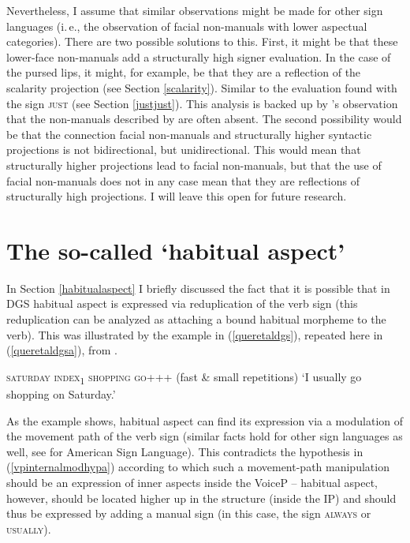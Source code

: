 Nevertheless, I assume that similar observations might be made for other sign languages (i.\,e., the observation of facial non-manuals with lower aspectual categories). There are two possible solutions to this. First, it might be that these lower-face non-manuals add a structurally high signer evaluation. In the case of the pursed lips, it might, for example, be that they are a reflection of the scalarity projection (see Section \ref{scalarity}). Similar to the evaluation found with the sign \textsc{just} (see Section \ref{justjust}). This analysis is backed up by \citeauthor{boven2018throughaspect}'s observation that the non-manuals described by \citet{hoitingslobin2001typological} are often absent. The second possibility would be that the connection facial non-manuals and structurally higher syntactic projections is not bidirectional, but unidirectional. This would mean that structurally higher projections lead to facial non-manuals, but that the use of facial non-manuals does not in any case mean that they are reflections of structurally high projections. I will leave this open for future research.


\section{The so-called `habitual aspect'}\label{habitualtwo}
In Section \ref{habitualaspect} I briefly discussed the fact that it is possible that in DGS habitual aspect is expressed via reduplication of the verb sign (this reduplication can be analyzed as attaching a bound habitual morpheme to the verb). This was illustrated by the example in (\ref{queretaldgs}), repeated here in (\ref{queretaldgsa}), from \citet[225]{signgram2017}.

\begin{exe}
\ex \textsc{saturday index\textsubscript{1} shopping go+++} (fast \& small repetitions) 
\glt `I usually go shopping on Saturday.'\label{queretaldgsa}
\end{exe}

\noindent As the example shows, habitual aspect can find its expression via a modulation of the movement path of the verb sign (similar facts hold for other sign languages as well, see \citealt{wilbur2009productive} for American Sign Language). This contradicts the hypothesis in (\ref{vpinternalmodhypa}) according to which such a movement-path manipulation should be an expression of inner aspects inside the VoiceP -- habitual aspect, however, should be located higher up in the structure (inside the IP) and should thus be expressed by adding a manual sign (in this case, the sign \textsc{always} or \textsc{usually}). 

